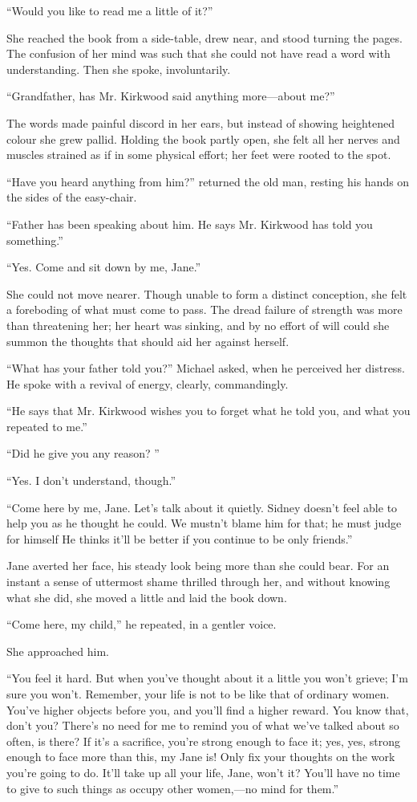 ``Would you like to read me a little of it?''

She reached the book from a side-table, drew near, and stood turning the
pages. The confusion of her mind was such that she could not have read a
word with understanding. Then she spoke, involuntarily.

{}``Grandfather, has Mr. Kirkwood said anything more---about me?''

The words made painful discord in her ears, but instead of showing
heightened colour she grew pallid. Holding the book partly open, she
felt all her nerves and muscles strained as if in some physical effort;
her feet were rooted to the spot.

``Have you heard anything from him?'' returned the old man, resting his
hands on the sides of the easy-chair.

``Father has been speaking about him. He says Mr. Kirkwood has told you
something.''

``Yes. Come and sit down by me, Jane.''

She could not move nearer. Though unable to form a distinct conception,
she felt a foreboding of what must come to pass. The dread failure of
strength was more than threatening her; her heart was sinking, and by no
effort of will could she summon the thoughts that should aid her against
herself.

``What has your father told you?'' Michael asked, when he perceived her
distress. He spoke with a revival of energy, clearly, commandingly.

``He says that Mr. Kirkwood wishes you to {}forget what he told you, and
what you repeated to me.''

``Did he give you any reason? ''

``Yes. I don't understand, though.''

``Come here by me, Jane. Let's talk about it quietly. Sidney doesn't
feel able to help you as he thought he could. We mustn't blame him for
that; he must judge for himself He thinks it'll be better if you
continue to be only friends.''

Jane averted her face, his steady look being more than she could bear.
For an instant a sense of uttermost shame thrilled through her, and
without knowing what she did, she moved a little and laid the book down.

``Come here, my child,'' he repeated, in a gentler voice.

She approached him.

``You feel it hard. But when you've thought about it a little you won't
grieve; I'm sure you won't. Remember, your life is not to be like that
of ordinary women. You've higher objects before you, and you'll find a
higher reward. You know that, don't you? There's no need for me to
remind you of what we've talked about so often, is there? If it's {}a
sacrifice, you're strong enough to face it; yes, yes, strong enough to
face more than this, my Jane is! Only fix your thoughts on the work
you're going to do. It'll take up all your life, Jane, won't it? You'll
have no time to give to such things as occupy other women,---no mind for
them.''

